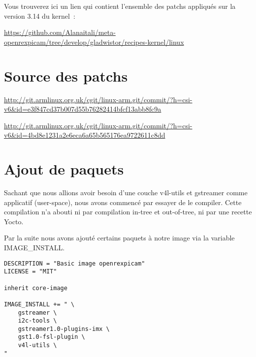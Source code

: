 Vous trouverez ici un lien qui contient l’ensemble des patchs appliqués sur la version 3.14 du kernel :

\href{https://github.com/Alanaitali/meta-openrexpicam/tree/develop/gladwistor/recipes-kernel/linux}{https://github.com/Alanaitali/meta-openrexpicam/tree/develop/gladwistor/recipes-kernel/linux}

\section{Source des patchs}

\href{http://git.armlinux.org.uk/cgit/linux-arm.git/commit/?h=csi-v6&id=e3f847cd37b007d55b76282414bfcf13abb8fc9a}{http://git.armlinux.org.uk/cgit/linux-arm.git/commit/?h=csi-v6\&id=e3f847cd37b007d55b76282414bfcf13abb8fc9a}

\href{http://git.armlinux.org.uk/cgit/linux-arm.git/commit/?h=csi-v6&id=4bd8e1231a2e6eca6a65b565176ea9722611c8dd}{http://git.armlinux.org.uk/cgit/linux-arm.git/commit/?h=csi-v6\&id=4bd8e1231a2e6eca6a65b565176ea9722611c8dd}

\section{Ajout de paquets}

Sachant que nous allions avoir besoin d’une couche v4l-utils et gstreamer comme applicatif (user-space),
nous avons commencé par essayer de le compiler. Cette compilation n’a abouti ni par compilation in-tree
et out-of-tree, ni par une recette Yocto.

\clearpage

Par la suite nous avons ajouté certains paquets à notre image via la variable IMAGE\_INSTALL.

\begin{lstlisting}
DESCRIPTION = "Basic image openrexpicam"
LICENSE = "MIT"
    
inherit core-image
    
IMAGE_INSTALL += " \
    gstreamer \
    i2c-tools \
    gstreamer1.0-plugins-imx \
    gst1.0-fsl-plugin \
    v4l-utils \
"
\end{lstlisting}